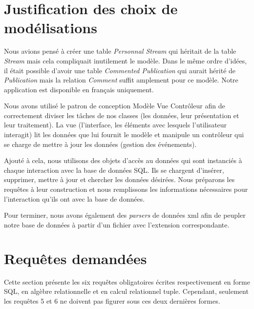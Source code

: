 \documentclass[a4paper,10pt]{article}
\begin{document}
\section{Justification des choix de modélisations}

Nous avions pensé à créer une table \textsl{Personnal Stream} qui héritait de la table \textsl{Stream} mais cela compliquait inutilement le modèle. Dans le même ordre d'idées, il était possible d'avoir une table \textsl{Commented Publication} qui aurait hérité de \textsl{Publication} mais la relation \textsl{Comment} suffit amplement pour ce modèle. Notre application est disponible en français uniquement.
\

Nous avons utilisé le patron de conception Modèle Vue Contrôleur afin de correctement diviser les tâches de nos classes (les données, leur présentation et leur traitement). La vue (l'interface, les éléments avec lesquels l'utilisateur interagit) lit les données que lui fournit le modèle et manipule un contrôleur qui se charge de mettre à jour les données (gestion des événements). 
\

Ajouté à cela, nous utilisons des objets d'accès au données qui sont instanciés à chaque interaction avec la base de données SQL. Ils se chargent d'insérer, supprimer, mettre à jour et chercher les données désirées. Nous préparons les requêtes à leur construction et nous remplissons les informations nécessaires pour l'interaction qu'ils ont avec la base de données.
\

Pour terminer, nous avons également des \textsl{parsers} de données xml afin de peupler notre base de données à partir d'un fichier avec l'extension correspondante.

\section{Requêtes demandées}

Cette section présente les six requêtes obligatoires écrites respectivement en forme SQL, en algèbre relationnelle et en calcul relationnel tuple. Cependant, seulement les requêtes 5 et 6 ne doivent pas figurer sous ces deux dernières formes.
\end{document}
